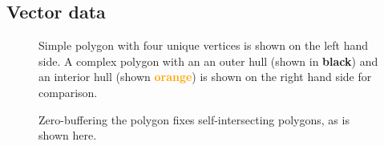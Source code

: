 \subsection{Vector data}

\begin{figure}[htb]
  \centering
  
  \textcolor{gray}{\vrule}
  \hspace{0.01\linewidth}
  
  \caption{
    Simple polygon with four unique vertices is shown on the left hand side.
    A complex polygon with an an outer hull (shown in \textbf{black})
    and an interior hull (shown \textcolor{orange}{\textbf{orange}}) is shown on the right hand side for comparison.
  }
\end{figure}

\begin{figure}[H]
  \centering
  
  \caption{Zero-buffering the polygon fixes self-intersecting polygons, as is shown here.}
\end{figure}
